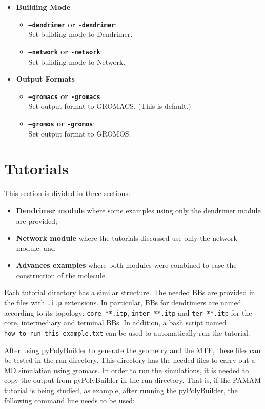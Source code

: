 \documentclass[12pt]{article}
\begin{document}
\begin{itemize}
\item \textbf{Building Mode}
\begin{itemize}
  \item \textbf{\texttt{--dendrimer} or \texttt{-dendrimer}}:\\
    Set building mode to Dendrimer.
  \item \textbf{\texttt{--network} or \texttt{-network}}:\\
    Set building mode to Network.
\end{itemize}

\item \textbf{Output Formats}
\begin{itemize}
  \item \textbf{\texttt{--gromacs} or \texttt{-gromacs}}:\\
    Set output format to GROMACS. (This is default.)
  \item \textbf{\texttt{--gromos} or \texttt{-gromos}}:\\
    Set output format to GROMOS.
\end{itemize}

\end{itemize}


\section{Tutorials}

This section is divided in three sections:
\begin{itemize}
    \item \textbf{Dendrimer module}
    where some examples using only the dendrimer module are provided;
    \item \textbf{Network module}
    where the tutorials discussed use only the network module; and
    \item \textbf{Advances examples}
    where both modules were combined to ease the construction of the molecule.
\end{itemize}

Each tutorial directory has a similar structure. 
The needed BBs are provided in the files with \texttt{.itp} extensions.
In particular, BBs for dendrimers are named according to its topology: \texttt{core\_**.itp}, \texttt{inter\_**.itp} and \texttt{ter\_**.itp} for the core, intermediary and terminal BBs.
In addition, a bash script named \texttt{how\_to\_run\_this\_example.txt} can be used to automatically run the tutorial.

After using pyPolyBuilder to generate the geometry and the MTF, these files can be tested in the run directory.
This directory has the needed files to carry out a MD simulation using gromacs.
In order to run the simulations, it is needed to copy the output from pyPolyBuilder in the run directory.
That is, if the PAMAM tutorial is being studied, as example, after running the pyPolyBuilder, the following command line needs to be used:
\end{document}
